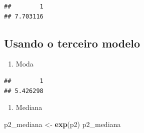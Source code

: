\documentclass[]{article}
\newenvironment{Shaded}{\begin{snugshade}}{\end{snugshade}}
\newcommand{\KeywordTok}[1]{\textcolor[rgb]{0.13,0.29,0.53}{\textbf{#1}}}
\newcommand{\DataTypeTok}[1]{\textcolor[rgb]{0.13,0.29,0.53}{#1}}
\newcommand{\DecValTok}[1]{\textcolor[rgb]{0.00,0.00,0.81}{#1}}
\newcommand{\StringTok}[1]{\textcolor[rgb]{0.31,0.60,0.02}{#1}}
\newcommand{\OperatorTok}[1]{\textcolor[rgb]{0.81,0.36,0.00}{\textbf{#1}}}
\newcommand{\NormalTok}[1]{#1}
\providecommand{\tightlist}{%
  \setlength{\itemsep}{0pt}\setlength{\parskip}{0pt}}
\begin{document}
\begin{Shaded}
\end{Shaded}

\begin{verbatim}
##        1 
## 7.703116
\end{verbatim}

\subsection{Usando o terceiro modelo}\label{usando-o-terceiro-modelo}

\begin{enumerate}
\def\labelenumi{\alph{enumi}.}
\tightlist
\item
  Moda
\end{enumerate}

\begin{Shaded}
\end{Shaded}

\begin{verbatim}
##        1 
## 5.426298
\end{verbatim}

\begin{enumerate}
\def\labelenumi{\alph{enumi}.}
\setcounter{enumi}{1}
\tightlist
\item
  Mediana
\end{enumerate}

\begin{Shaded}
\begin{Highlighting}[]
\NormalTok{p2_mediana <-}\StringTok{ }\KeywordTok{exp}\NormalTok{(p2)}
\NormalTok{p2_mediana}
\end{Highlighting}
\end{Shaded}
\end{document}
